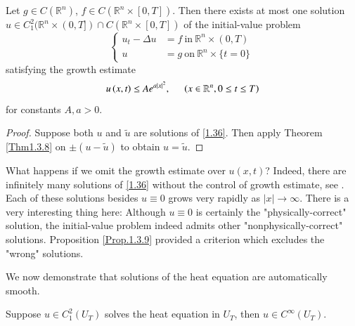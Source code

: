 \begin{proposition}\label{Prop.1.3.9}
Let $g\in C(\mathbb{R}^n)$, $f\in C(\mathbb{R}^n\times[0,T])$. Then there exists at most one solution $u\in C_1^2(\mathbb{R}^n\times(0,T])\cap C(\mathbb{R}^n\times[0,T])$ of the initial-value problem 
\begin{equation}\label{1.36}
\left\{ \begin{aligned}
	u_t-\Delta u&=f\ \text{in}\ \mathbb{R}^n\times(0,T)\\
	u&=g\ \text{on}\ \mathbb{R}^n\times\{t=0\}\
\end{aligned} \right. 
\end{equation}
satisfying the growth estimate 
$$
u\left( x,t \right) \le Ae^{a\left| x \right|^2},\hspace{0.5cm}\left( x\in \mathbb{R} ^n,0\le t\le T \right) 
$$
for constants $A,a>0$.
\end{proposition}
\begin{proof}
Suppose both $u$ and $\widetilde{u}$ are solutions of \eqref{1.36}. Then apply Theorem \ref{Thm1.3.8} on $\pm(u-\widetilde{u})$ to obtain $u=\widetilde{u}$.
\end{proof}
What happens if we omit the growth estimate over $u(x,t)$? Indeed, there are infinitely many solutions of \ref{1.36} without the control of growth estimate, see \cite{bers1964partial}. Each of these solutions besides $u\equiv 0$ grows very rapidly as $|x|\to\infty$. There is a very interesting thing here: Although $u\equiv0$ is certainly the "physically-correct" solution, the initial-value problem indeed admits other "nonphysically-correct" solutions. Proposition \ref{Prop.1.3.9} provided a criterion which excludes the "wrong" solutions.\par
We now demonstrate that solutions of the heat equation are automatically smooth.
\begin{theorem}\label{Thm1.3.10}
Suppose $u\in C_1^2(U_T)$ solves the heat equation in $U_T$, then $u\in C^\infty(U_T)$.
\end{theorem}
